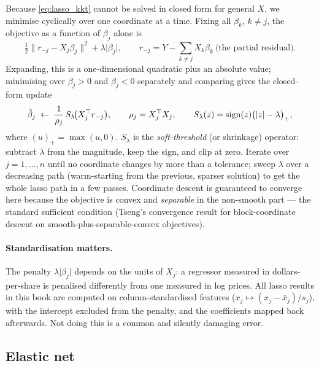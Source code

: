 Because \eqref{eq:lasso_kkt} cannot be solved in closed form for general $X$, we minimise
cyclically over one coordinate at a time. Fixing all $\beta_k$, $k\ne j$, the objective as
a function of $\beta_j$ alone is
\[
  \tfrac12\lVert r_{-j} - X_j\beta_j\rVert^2 + \lambda\lvert\beta_j\rvert,
  \qquad r_{-j}=Y-\sum_{k\ne j}X_k\beta_k \ \text{(the partial residual)}.
\]
Expanding, this is a one-dimensional quadratic plus an absolute value; minimising over
$\beta_j>0$ and $\beta_j<0$ separately and comparing gives the closed-form update
\begin{equation}
  \hat\beta_j \;\leftarrow\; \frac{1}{\rho_j}\,S_{\lambda}\!\bigl(X_j^{\top}r_{-j}\bigr),
  \qquad \rho_j = X_j^{\top}X_j,
  \qquad
  S_{\lambda}(z)=\operatorname{sign}(z)\bigl(\lvert z\rvert-\lambda\bigr)_{+},
  \label{eq:softthresh}
\end{equation}
where $(u)_+=\max(u,0)$. $S_\lambda$ is the \emph{soft-threshold} (or shrinkage)
operator: subtract $\lambda$ from the magnitude, keep the sign, and clip at zero.
Iterate over $j=1,\dots,n$ until no coordinate changes by more than a tolerance; sweep
$\lambda$ over a decreasing path (warm-starting from the previous, sparser solution) to
get the whole lasso path in a few passes. Coordinate descent is guaranteed to converge
here because the objective is convex and \emph{separable} in the non-smooth part --- the
standard sufficient condition (Tseng's convergence result for block-coordinate descent on
smooth-plus-separable-convex objectives).

\paragraph{Standardisation matters.} The penalty $\lambda\lvert\beta_j\rvert$ depends on
the units of $X_j$: a regressor measured in dollars-per-share is penalised differently
from one measured in log prices. All lasso results in this book are computed on
column-standardised features ($x_j\mapsto(x_j-\bar x_j)/s_j$), with the intercept
excluded from the penalty, and the coefficients mapped back afterwards. Not doing this is
a common and silently damaging error.

\subsection{Elastic net}
\label{sec:elasticnet}

